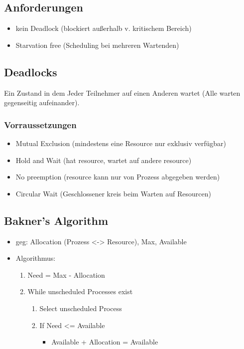 \subsection{Anforderungen}
\begin{itemize}
    \item kein Deadlock (blockiert außerhalb v. kritischem Bereich)
    \item Starvation free (Scheduling bei mehreren Wartenden)
\end{itemize}

\subsection{Deadlocks}
Ein Zustand in dem Jeder Teilnehmer auf einen Anderen wartet (Alle warten gegenseitig aufeinander).

\subsubsection{Vorraussetzungen}
\begin{itemize}
    \item Mutual Exclusion (mindestens eine Resource nur exklusiv verfügbar)
    \item Hold and Wait (hat resource, wartet auf andere resource)
    \item No preemption (resource kann nur von Prozess abgegeben werden)
    \item Circular Wait (Geschlossener kreis beim Warten auf Resourcen)
\end{itemize}

\subsection{Bakner's Algorithm}
\begin{itemize}
    \item geg: Allocation (Prozess <-> Resource), Max, Available
    \item Algorithmus:
    \begin{enumerate}
        \item Need = Max - Allocation
        \item While unscheduled Processes exist
        \begin{enumerate}
            \item Select unscheduled Process
            \item If Need <= Available
            \begin{itemize}
                \item Available + Allocation = Available
            \end{itemize}
        \end{enumerate}
    \end{enumerate}
\end{itemize}

